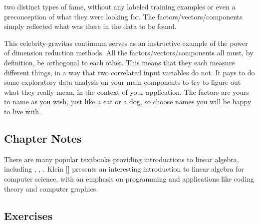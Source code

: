 \documentclass[10pt]{article}
\begin{document}
\noindent
two distinct types of fame, without any labeled training examples or even a preconception of what they were looking for. The factors/vectors/components simply reflected what was there in the data to be found.

This celebrity-gravitas continuum serves as an instructive example of the power of dimension reduction methods. All the factors/vectors/components all must, by definition, be orthogonal to each other. This means that they each measure different things, in a way that two correlated input variables do not. It pays to do some exploratory data analysis on your main components to try to figure out what they really mean, in the context of your application. The factors are yours to name as you wish, just like a cat or a dog, so choose names you will be happy to live with.

\subsection{Chapter Notes}
There are many popular textbooks providing introductions to linear algebra, including \cite{lay2015linear}, \cite{strang2011introduction}, \cite{tucker1988unified}. Klein [\cite{klein2013coding}] presents an interesting introduction to linear algebra for computer science, with an emphasis on programming and applications like coding theory and computer graphics.

\subsection{Exercises}
\end{document}
